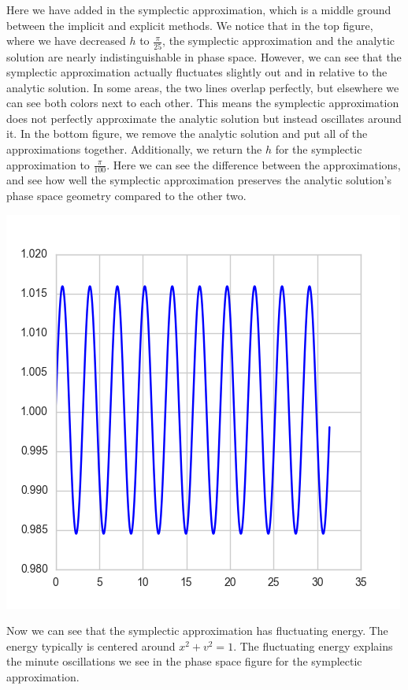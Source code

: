 \documentclass[12pt, letterpaper]{article}
\begin{document}
Here we have added in the symplectic approximation, which is a middle ground between the implicit and explicit methods. We notice that in the top figure, where we have decreased $h$ to $\frac{\pi}{25}$, the symplectic approximation and the analytic solution are nearly indistinguishable in phase space. However, we can see that the symplectic approximation actually fluctuates slightly out and in relative to the analytic solution. In some areas, the two lines overlap perfectly, but elsewhere we can see both colors next to each other. This means the symplectic approximation does not perfectly approximate the analytic solution but instead oscillates around it. In the bottom figure, we remove the analytic solution and put all of the approximations together. Additionally, we return the $h$ for the symplectic approximation to $\frac{\pi}{100}$. Here we can see the difference between the approximations, and see how well the symplectic approximation preserves the analytic solution's phase space geometry compared to the other two.

\begin{center}
\includegraphics[scale=0.8]{symEnergy.png}
\end{center}

Now we can see that the symplectic approximation has fluctuating energy. The energy typically is centered around $x^2 + v^2 = 1$. The fluctuating energy explains the minute oscillations we see in the phase space figure for the symplectic approximation.
\end{document}
